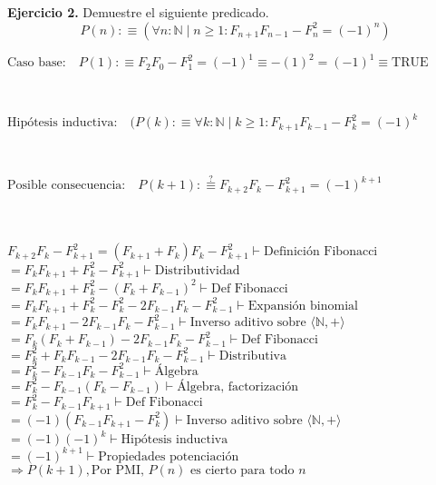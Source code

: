 \documentclass{article}
\begin{document}
\textbf{Ejercicio 2.} Demuestre el siguiente predicado.
$$P(n) : \equiv ( \forall n: \mathbb{N} \mid n \geq
1:F_{n+1}F_{n-1}-F_{n}^2=(-1)^n ) $$ 
{\raggedright
$\text{Caso base:} \quad P(1) : \equiv F_{2}F_{0}-F_{1}^2=(-1)^1  \equiv
-(1)^2=(-1)^1 \equiv \text{TRUE}$
} \\
{\raggedright
$\text{Hip\'otesis inductiva:} \quad (P(k) : \equiv  \forall k: \mathbb{N} \mid
k \geq 1:F_{k+1}F_{k-1}-F_{k}^2=(-1)^k $ 
} \\
{\raggedright
$\text{Posible consecuencia:} \quad P(k+1) : \stackrel{?}{\equiv}
F_{k+2}F_{k}-F_{k+1}^2=(-1)^{k+1} $ } \\
\\
$ F_{k+2}F_{k}-F_{k+1}^2 = (F_{k+1}+F_{k})F_{k}-F_{k+1}^2 \vdash
\text{Definici\'on Fibonacci} $\\
$  = F_{k}F_{k+1}+F_{k}^2-F_{k+1}^2 \vdash \text{Distributividad} $ \\
$  = F_{k}F_{k+1}+F_{k}^2-(F_{k}+F_{k-1})^2 \vdash \text{Def Fibonacci} $ \\
$  = F_{k}F_{k+1}+F_{k}^2-F_{k}^2-2F_{k-1}F_{k}-F_{k-1}^2 \vdash
     \text{Expansi\'on binomial} $ \\
$  = F_{k}F_{k+1}-2F_{k-1}F_{k}-F_{k-1}^2 \vdash
     \text{Inverso aditivo sobre $\langle \mathbb{N},+
\rangle$} $ \\
$  = F_{k}(F_{k}+F_{k-1})-2F_{k-1}F_{k}-F_{k-1}^2 \vdash
     \text{Def Fibonacci} $ \\
$  = F_{k}^2+F_{k}F_{k-1}-2F_{k-1}F_{k}-F_{k-1}^2 \vdash
     \text{Distributiva} $ \\
$  = F_{k}^2-F_{k-1}F_{k}-F_{k-1}^2 \vdash
     \text{\'Algebra} $ \\
$  = F_{k}^2-F_{k-1}(F_{k}-F_{k-1}) \vdash
     \text{\'Algebra, factorizaci\'on} $ \\
$  = F_{k}^2-F_{k-1}F_{k+1} \vdash
     \text{Def Fibonacci} $ \\
$  = (-1)(F_{k-1}F_{k+1}-F_{k}^2) \vdash
     \text{Inverso aditivo sobre $\langle \mathbb{N},+
\rangle$} $ \\
$  = (-1)(-1)^k \vdash
     \text{Hip\'otesis inductiva} $ \\
$  = (-1)^{k+1} \vdash
     \text{Propiedades potenciaci\'on} $ \\
$  \Rightarrow P(k+1),\text{Por PMI, $P(n)$ es cierto para todo $n$} $ \\
\end{document}
